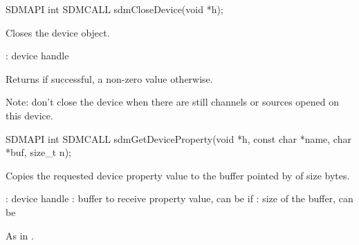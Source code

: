 \documentclass[a4paper,12pt,twoside,extrafontsizes]{memoir}
\begin{document}


\begin{cfuncprototype}
SDMAPI int SDMCALL sdmCloseDevice(void *h);
\end{cfuncprototype}

\begin{funcdescr}
	Closes the device object.
\end{funcdescr}

\begin{funcparams}
	: device handle
\end{funcparams}

\begin{funcret}
	Returns  if successful, a non-zero value otherwise.
\end{funcret}

\begin{funcremarks}
	Note: don't close the device when there are still channels or sources opened on this device.
\end{funcremarks}



\begin{cfuncprototype}
SDMAPI int SDMCALL sdmGetDeviceProperty(void *h, const char *name, char *buf, size_t n);
\end{cfuncprototype}

\begin{funcdescr}
	Copies the requested device property value to the buffer pointed by  of size  bytes.
\end{funcdescr}

\begin{funcparams}
	: device handle
	: buffer to receive property value, can be  if 
	: size of the buffer, can be 
\end{funcparams}

\begin{funcret}
	As in .
\end{funcret}

\end{document}
